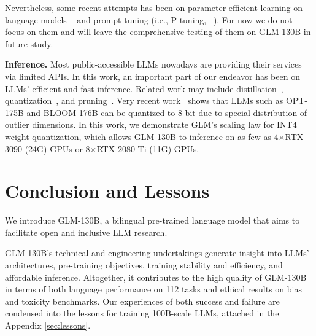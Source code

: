 Nevertheless, some recent attempts has been on parameter-efficient learning on language models ~\citep{houlsby2019parameter} and prompt tuning (i.e., P-tuning, ~\cite{li2021prefix,liu2021gpt,lester2021power,liu2022p}). For now we do not focus on them and will leave the comprehensive testing of them on GLM-130B in future study.

\textbf{Inference.}
Most public-accessible LLMs nowadays are providing their services via limited APIs. In this work, an important part of our endeavor has been on LLMs' efficient and fast inference. Related work may include distillation~\citep{sanh2019distilbert,jiao2020tinybert,wang2020minilm}, quantization~\citep{zafrir2019q8bert,shen2020q,tao2022compression}, and pruning~\citep{michel2019sixteen,fan2019reducing}. Very recent work~\citep{dettmers2022llm} shows that LLMs such as OPT-175B and BLOOM-176B can be quantized to 8 bit due to special distribution of outlier dimensions. In this work, we demonstrate GLM's scaling law for INT4 weight quantization, which allows GLM-130B to inference on as few as 4$\times$RTX 3090 (24G) GPUs or 8$\times$RTX 2080 Ti (11G) GPUs.

\section{Conclusion and Lessons}

We introduce GLM-130B, a bilingual pre-trained language model that aims to facilitate open and inclusive LLM research. 

GLM-130B's technical and engineering undertakings generate insight into LLMs' architectures, pre-training objectives, training stability and efficiency, and affordable inference. Altogether, it contributes to the high quality of GLM-130B in terms of both language performance on 112 tasks and ethical results on bias and toxicity benchmarks. Our experiences of both success and failure are condensed into the lessons for training 100B-scale LLMs, attached in the Appendix \ref{sec:lessons}.


